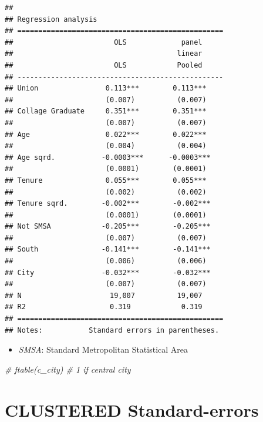 \documentclass[
]{article}
\newenvironment{Shaded}{\begin{snugshade}}{\end{snugshade}}
\newcommand{\CommentTok}[1]{\textcolor[rgb]{0.56,0.35,0.01}{\textit{#1}}}
\providecommand{\tightlist}{%
  \setlength{\itemsep}{0pt}\setlength{\parskip}{0pt}}
\begin{document}
\begin{verbatim}
## 
## Regression analysis
## =================================================
##                        OLS             panel     
##                                       linear     
##                        OLS            Pooled     
## -------------------------------------------------
## Union                0.113***        0.113***    
##                      (0.007)          (0.007)    
## Collage Graduate     0.351***        0.351***    
##                      (0.007)          (0.007)    
## Age                  0.022***        0.022***    
##                      (0.004)          (0.004)    
## Age sqrd.           -0.0003***      -0.0003***   
##                      (0.0001)        (0.0001)    
## Tenure               0.055***        0.055***    
##                      (0.002)          (0.002)    
## Tenure sqrd.        -0.002***        -0.002***   
##                      (0.0001)        (0.0001)    
## Not SMSA            -0.205***        -0.205***   
##                      (0.007)          (0.007)    
## South               -0.141***        -0.141***   
##                      (0.006)          (0.006)    
## City                -0.032***        -0.032***   
##                      (0.007)          (0.007)    
## N                     19,007          19,007     
## R2                    0.319            0.319     
## =================================================
## Notes:           Standard errors in parentheses.
\end{verbatim}

\begin{itemize}
\tightlist
\item
  \emph{SMSA}: Standard Metropolitan Statistical Area
\end{itemize}

\begin{Shaded}
\begin{Highlighting}[]
\CommentTok{\# ftable(c\_city) \# 1 if central city}
\end{Highlighting}
\end{Shaded}

\hypertarget{clustered-standard-errors}{%
\section{CLUSTERED Standard-errors}\label{clustered-standard-errors}}
\end{document}
